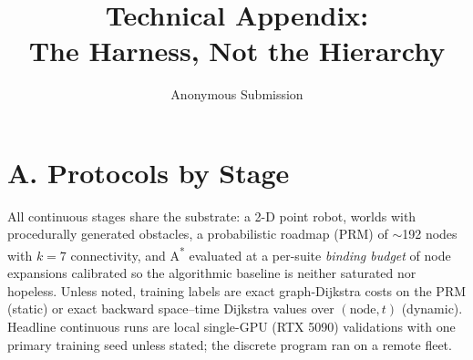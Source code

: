 \documentclass[letterpaper]{article} %
\title{Technical Appendix:\\The Harness, Not the Hierarchy}
\author{Anonymous Submission}
\begin{document}
\maketitle

\section{A. Protocols by Stage}

All continuous stages share the substrate: a 2-D point robot, worlds with procedurally generated obstacles, a probabilistic roadmap (PRM) of $\sim$192 nodes with $k{=}7$ connectivity, and A\textsuperscript{*} evaluated at a per-suite \emph{binding budget} of node expansions calibrated so the algorithmic baseline is neither saturated nor hopeless. Unless noted, training labels are exact graph-Dijkstra costs on the PRM (static) or exact backward space--time Dijkstra values over $(\text{node},t)$ (dynamic). Headline continuous runs are local single-GPU (RTX 5090) validations with one primary training seed unless stated; the discrete program ran on a remote fleet.
\end{document}
